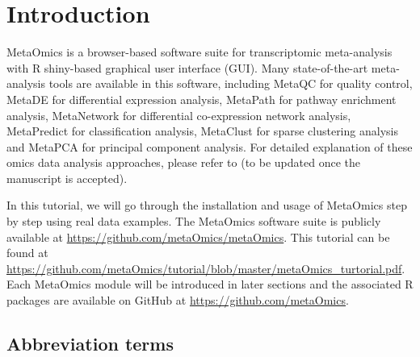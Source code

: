 \section{Introduction}
 
MetaOmics is a browser-based software suite for transcriptomic meta-analysis with R shiny-based graphical user interface (GUI).
Many state-of-the-art meta-analysis tools are available in this software,
including %
MetaQC for quality control, 
MetaDE for differential expression analysis,
MetaPath for pathway enrichment analysis,
MetaNetwork for differential co-expression network analysis,
MetaPredict for classification analysis,
MetaClust for sparse clustering analysis and 
MetaPCA for principal component analysis.
For detailed explanation of these omics data analysis approaches, 
please refer to (to be updated once the manuscript is accepted).


In this tutorial, 
we will go through the installation and usage of MetaOmics step by step using real data examples.
The MetaOmics software suite is publicly available at \url{https://github.com/metaOmics/metaOmics}.
This tutorial can be found at \url{https://github.com/metaOmics/tutorial/blob/master/metaOmics_turtorial.pdf}.
Each MetaOmics module will be introduced in later sections and the associated R packages are available on GitHub at \url{https://github.com/metaOmics}.


\subsection{Abbreviation terms}
\label{AbbreviationTerms}


